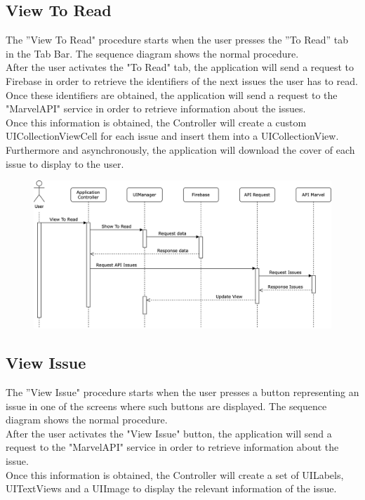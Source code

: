 \subsection{View To Read}
The ”View To Read" procedure starts when the user presses the ”To Read” tab in the Tab Bar. The sequence diagram shows the normal procedure. \\
After the user activates the "To Read" tab, the application will send a request to Firebase in order to retrieve the identifiers of the next issues the user has to read. \\
Once these identifiers are obtained, the application will send a request to the "MarvelAPI" service in order to retrieve information about the issues. \\
Once this information is obtained, the Controller will create a custom UICollectionViewCell for each issue and insert them into a UICollectionView. \\
Furthermore and asynchronously, the application will download the cover of each issue to display to the user.

\vspace{5mm}

\begin{figure}[h]
\centering
\includegraphics[width=\textwidth]{img/seqdiagrams/viewtoread}
\end{figure}

\clearpage

\subsection{View Issue}
The ”View Issue" procedure starts when the user presses a button representing an issue in one of the screens where such buttons are displayed. The sequence diagram shows the normal procedure. \\
After the user activates the "View Issue" button, the application will send a request to the "MarvelAPI" service in order to retrieve information about the issue. \\
Once this information is obtained, the Controller will create a set of UILabels, UITextViews and a UIImage to display the relevant information of the issue. 

